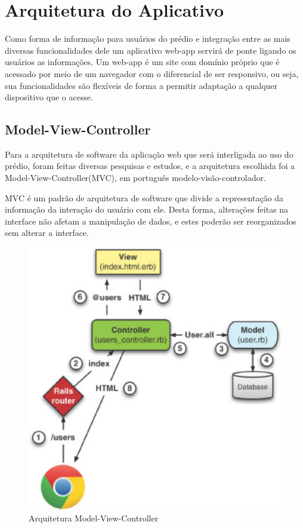 \section{Arquitetura do Aplicativo}

Como forma de informação para usuários do prédio e integração entre as mais diversas funcionalidades dele um aplicativo web-app servirá de ponte ligando os usuários as informações.
Um web-app é um site com domínio próprio que é acessado por meio de um navegador com o diferencial de ser responsivo, ou seja, sua funcionalidades são flexíveis de forma a permitir adaptação a qualquer dispositivo que o acesse.

\subsection{Model-View-Controller}

Para a arquitetura de software da aplicação web que será interligada ao uso do prédio, foram feitas diversas pesquisas e estudos, e a arquitetura escolhida foi a Model-View-Controller(MVC), em português modelo-visão-controlador.

MVC é um padrão de arquitetura de software que divide a representação da informação da interação do usuário com ele. Desta forma, alterações feitas na interface não afetam a manipulação de dados, e estes poderão ser reorganizados sem alterar a interface.

\begin{figure}[!ht]
  \centering
  \includegraphics[keepaspectratio=true,scale=0.45]{figuras/MVC.eps}
  \caption{Arquitetura Model-View-Controller}
  \label{fig:mvc}
\end{figure}

